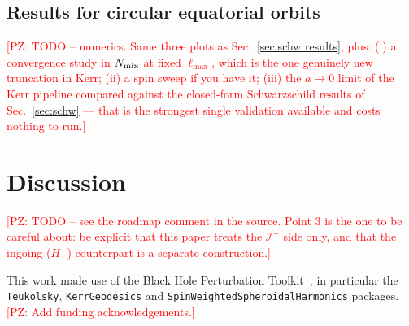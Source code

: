 \documentclass[preprint,aps,nofootinbib,a4paper,superscriptaddress,longbibliography,amsfonts, amssymb,amsmath,titlepage]{revtex4-1}
\numberwithin{equation}{section} %
\newcommand{\PZ}[1]{\textcolor{red}{\textsf{[PZ: #1]}}}
\def\l{\ensuremath{\ell}}
\def\scri{\mathscr{I}^{+}}
\begin{document}
\subsection{Results for circular equatorial orbits}
\label{sec:kerr results}
\PZ{TODO -- numerics.  Same three plots as Sec.~\ref{sec:schw results}, plus:
(i) a convergence study in $N_{\rm mix}$ at fixed $\l_{\max}$, which is the
one genuinely new truncation in Kerr; (ii) a spin sweep if you have it;
(iii) the $a\to0$ limit of the Kerr pipeline compared against the closed-form
Schwarzschild results of Sec.~\ref{sec:schw} --- that is the strongest single
validation available and costs nothing to run.}


\section{Discussion}
\label{sec:discussion}
\PZ{TODO -- see the roadmap comment in the source.  Point 3 is the one to be
careful about: be explicit that this paper treats the $\scri$ side only, and
that the ingoing ($H^{-}$) counterpart is a separate construction.}


\begin{acknowledgments}
This work made use of the Black Hole Perturbation Toolkit~\cite{BHPToolkit},
in particular the \texttt{Teukolsky}, \texttt{KerrGeodesics} and
\texttt{SpinWeightedSpheroidalHarmonics} packages.
\PZ{Add funding acknowledgements.}
\end{acknowledgments}


\appendix
\end{document}
